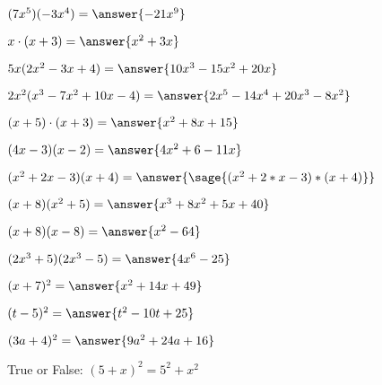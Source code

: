 \documentclass{ximera}
\begin{document}
\begin{problem}
$(7x^5)(-3x^4) = \answer{-21x^9}$
\end{problem}

\begin{problem}
$ x\cdot (x+3) = \answer{x^2+3x}$
\end{problem}

\begin{problem}
$5x(2x^2 - 3x +4) = \answer{10x^3-15x^2+20x}$
\end{problem}

\begin{problem}
$2 x^2  (x^3 - 7x^2 + 10x -4) =  \answer{2x^5-14x^4+20x^3-8x^2}$
\end{problem}

\begin{problem}
$ (x+5) \cdot (x+3) = \answer{x^2+8x+15}$
\end{problem}

\begin{problem}
$(4x-3)(x-2) = \answer{4x^2+6-11x}$
\end{problem}

\begin{problem}
$(x^2 + 2x -3) (x + 4) =  \answer{\sage{(x^2 + 2*x -3)*(x + 4)}}$
\end{problem}

\begin{problem}
$(x +8)(x^2+5)=\answer{x^3+8x^2+5x+40}$
\end{problem}

\begin{problem}
$(x + 8)(x-8)=\answer{x^2-64}$
\end{problem}

\begin{problem}
$(2x^3 + 5)(2x^3 - 5)=\answer{4x^6-25}$
\end{problem}

\begin{problem}
$(x+7)^2=\answer{x^2+14x+49}$
\end{problem}

\begin{problem}
$(t-5)^2 = \answer{t^2-10t+25}$
\end{problem}

\begin{problem}
$(3a + 4)^2 = \answer{9a^2+24a+16}$
\end{problem}

\begin{problem}
True or False: $ (5 + x)^2 = 5^2 + x^2 $
\begin{multipleChoice}
\end{multipleChoice}
\end{problem}
\end{document}
